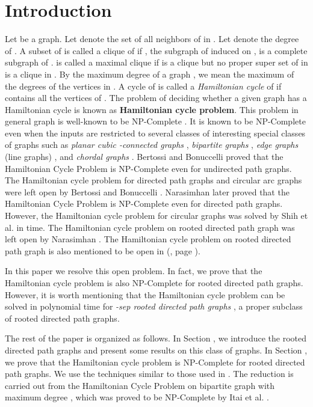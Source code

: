 \documentclass[a4paper,12pt]{article}
\theoremstyle{plain}
\theoremstyle{definition}
\theoremstyle{remark}
\begin{document}
\section{Introduction}
Let  be a graph. Let  denote the set of all neighbors
of  in . Let  denote the degree of . A subset
 of  is called a clique of  if , the subgraph of 
induced on , is a complete subgraph of .  is called a
maximal clique if  is a clique but no proper super set of  in
 is a clique in . By the maximum degree of a graph , we
mean the maximum of the degrees of the vertices in . A cycle 
of  is called a {\it Hamiltonian cycle} of  if  contains
all the vertices of . The problem of deciding whether a given
graph  has a Hamiltonian cycle is known as {\bf Hamiltonian cycle
problem}. This problem in general graph is well-known to be
NP-Complete \cite{garey}. It is known to be NP-Complete even when
the inputs are restricted to several classes of interesting special
classes of graphs such as {\it planar cubic -connected graphs}
\cite{dawes}, {\it bipartite graphs} \cite{bipartite}, {\it edge
graphs} (line graphs) \cite{booth}, and {\it chordal graphs}
\cite{stewart}. Bertossi and Bonuccelli \cite{bert} proved that the
Hamiltonian Cycle Problem is NP-Complete even for undirected path
graphs. The Hamiltonian cycle problem for directed path graphs and
circular arc graphs were left open by Bertossi and Bonuccelli
\cite{bert}. Narasimhan \cite{giri} later proved that the
Hamiltonian Cycle Problem is NP-Complete even for directed path
graphs. However, the Hamiltonian cycle problem for circular graphs
was solved   by Shih et al.\cite{hsu} in  time.
The Hamiltonian cycle problem on rooted directed path graph was left
open  by Narasimhan \cite{giri}. The Hamiltonian cycle problem on
rooted directed path graph is also mentioned to be open in
(\cite{spinrad}, page ).

In this paper we resolve this open problem. In fact, we prove that
the Hamiltonian cycle problem is also NP-Complete for rooted
directed path graphs. However, it is worth mentioning that the
Hamiltonian cycle problem can be solved in polynomial time for {\it
-sep rooted directed path graphs} \cite{panda}, a proper subclass
of rooted directed path graphs.

 The rest of the paper is organized as follows. In Section , we
introduce the rooted directed path graphs and present some results
on this class of graphs. In Section , we prove that the
Hamiltonian cycle problem is NP-Complete for  rooted directed path
graphs. We use the techniques similar to those used in
\cite{bert,giri}. The reduction is carried out from the Hamiltonian
Cycle Problem on bipartite graph with maximum  degree , which was
proved to be NP-Complete by Itai et al. \cite{itai}.
\end{document}
